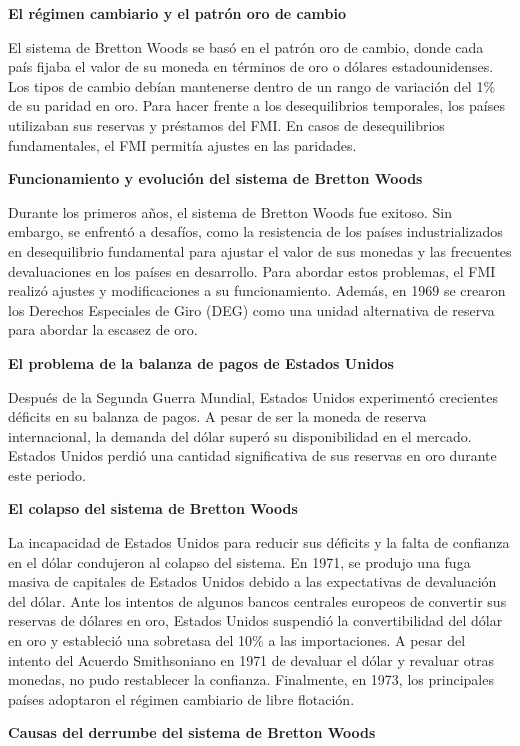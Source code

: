 \documentclass[
  a4paper,
]{article}
\begin{document}
\textbf{El régimen cambiario y el patrón oro de cambio}

El sistema de Bretton Woods se basó en el patrón oro de cambio, donde
cada país fijaba el valor de su moneda en términos de oro o dólares
estadounidenses. Los tipos de cambio debían mantenerse dentro de un
rango de variación del 1\% de su paridad en oro. Para hacer frente a los
desequilibrios temporales, los países utilizaban sus reservas y
préstamos del FMI. En casos de desequilibrios fundamentales, el FMI
permitía ajustes en las paridades.

\textbf{Funcionamiento y evolución del sistema de Bretton Woods}

Durante los primeros años, el sistema de Bretton Woods fue exitoso. Sin
embargo, se enfrentó a desafíos, como la resistencia de los países
industrializados en desequilibrio fundamental para ajustar el valor de
sus monedas y las frecuentes devaluaciones en los países en desarrollo.
Para abordar estos problemas, el FMI realizó ajustes y modificaciones a
su funcionamiento. Además, en 1969 se crearon los Derechos Especiales de
Giro (DEG) como una unidad alternativa de reserva para abordar la
escasez de oro.

\textbf{El problema de la balanza de pagos de Estados Unidos}

Después de la Segunda Guerra Mundial, Estados Unidos experimentó
crecientes déficits en su balanza de pagos. A pesar de ser la moneda de
reserva internacional, la demanda del dólar superó su disponibilidad en
el mercado. Estados Unidos perdió una cantidad significativa de sus
reservas en oro durante este periodo.

\textbf{El colapso del sistema de Bretton Woods}

La incapacidad de Estados Unidos para reducir sus déficits y la falta de
confianza en el dólar condujeron al colapso del sistema. En 1971, se
produjo una fuga masiva de capitales de Estados Unidos debido a las
expectativas de devaluación del dólar. Ante los intentos de algunos
bancos centrales europeos de convertir sus reservas de dólares en oro,
Estados Unidos suspendió la convertibilidad del dólar en oro y
estableció una sobretasa del 10\% a las importaciones. A pesar del
intento del Acuerdo Smithsoniano en 1971 de devaluar el dólar y revaluar
otras monedas, no pudo restablecer la confianza. Finalmente, en 1973,
los principales países adoptaron el régimen cambiario de libre
flotación.

\textbf{Causas del derrumbe del sistema de Bretton Woods}
\end{document}
